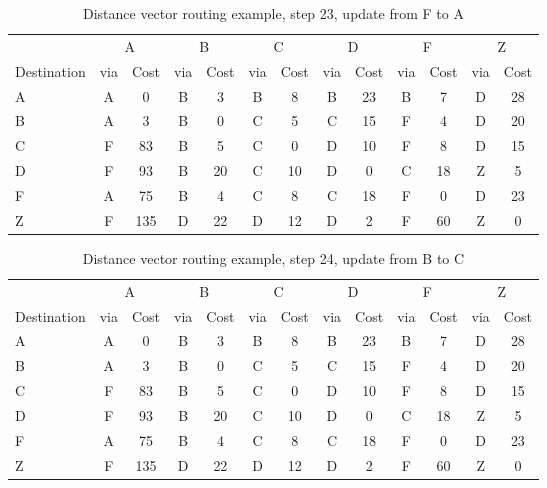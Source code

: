\begin{table}
    \caption{Distance vector  routing example, step 23, update from F to A }
    \label{tab:dv:step:23}
\begin{tabular}{l|c|c|c|c|c|c|c|c|c|c|c|c}
    \toprule
      & \multicolumn{2}{c|}{A}&\multicolumn{2}{c|}{B}&\multicolumn{2}{c|}{C}&\multicolumn{2}{c|}{D}&\multicolumn{2}{c|}{F}&\multicolumn{2}{c|}{Z} \\
    Destination & via&Cost&via&Cost&via&Cost&via&Cost&via&Cost&via&Cost \\ 
    \midrule
    A & A & 0 &B & 3 &B & 8 &B & 23 &B & 7 &D & 28 
 \\B & A & 3 &B & 0 &C & 5 &C & 15 &F & 4 &D & 20 
 \\C & F & 83 &B & 5 &C & 0 &D & 10 &F & 8 &D & 15 
 \\D & F & 93 &B & 20 &C & 10 &D & 0 &C & 18 &Z & 5 
 \\F & A & 75 &B & 4 &C & 8 &C & 18 &F & 0 &D & 23 
 \\Z & F & 135 &D & 22 &D & 12 &D & 2 &F & 60 &Z & 0 
    \\ \bottomrule 
\end{tabular}
\end{table}
    

\begin{table}
    \caption{Distance vector  routing example, step 24, update from B to C }
    \label{tab:dv:step:24}
\begin{tabular}{l|c|c|c|c|c|c|c|c|c|c|c|c}
    \toprule
      & \multicolumn{2}{c|}{A}&\multicolumn{2}{c|}{B}&\multicolumn{2}{c|}{C}&\multicolumn{2}{c|}{D}&\multicolumn{2}{c|}{F}&\multicolumn{2}{c|}{Z} \\
    Destination & via&Cost&via&Cost&via&Cost&via&Cost&via&Cost&via&Cost \\ 
    \midrule
    A & A & 0 &B & 3 &B & 8 &B & 23 &B & 7 &D & 28 
 \\B & A & 3 &B & 0 &C & 5 &C & 15 &F & 4 &D & 20 
 \\C & F & 83 &B & 5 &C & 0 &D & 10 &F & 8 &D & 15 
 \\D & F & 93 &B & 20 &C & 10 &D & 0 &C & 18 &Z & 5 
 \\F & A & 75 &B & 4 &C & 8 &C & 18 &F & 0 &D & 23 
 \\Z & F & 135 &D & 22 &D & 12 &D & 2 &F & 60 &Z & 0 
    \\ \bottomrule 
\end{tabular}
\end{table}
    

